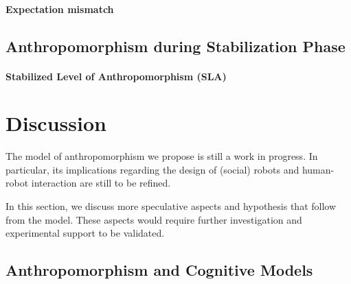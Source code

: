 \documentclass[twocolumn]{svjour3}          %
\begin{document}
\paragraph{Expectation mismatch}

\subsection{Anthropomorphism during Stabilization Phase}
\label{sec:stabilization}

\paragraph{Stabilized Level of Anthropomorphism (SLA)}


%
%
%
%
%
%

\section{Discussion}
\label{sec:discussion}

The model of anthropomorphism we propose is still a work in progress. In
particular, its implications regarding the design of (social) robots and
human-robot interaction are still to be refined.

In this section, we discuss more speculative aspects and hypothesis that follow
from the model. These aspects would require further investigation and
experimental support to be validated.

\subsection{Anthropomorphism and Cognitive Models}
\label{sec:cognitivemodel}
\end{document}
